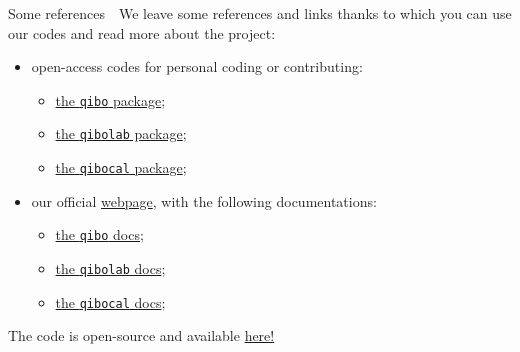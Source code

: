 \documentclass[8pt, xcolor={svgnames}, hyperref={colorlinks, linkcolor=black, citecolor=amethyst, urlcolor=amethyst}]{beamer}
\begin{document}
\begin{frame}{Some references}
\large
\faArrowCircleRight\,\, We leave some references and links thanks to which you can use our codes and read more about the project:

\begin{multicols}{2}
    
\begin{itemize}
\item[\faCode] open-access codes for personal coding or contributing:
    \begin{itemize}[noitemsep]
        \item[\faGithub]  \href{https://github.com/qiboteam/qibo}{the \texttt{qibo} package};
        \item[\faGithub]  \href{https://github.com/qiboteam/qibolab}{the \texttt{qibolab} package};
        \item[\faGithub]  \href{https://github.com/qiboteam/qibocal}{the \texttt{qibocal} package};
    \end{itemize}
 \vspace{1cm}

\item[\faBook] our official \href{https://qibo.science/}{webpage}, with the following documentations:
    \begin{itemize}[noitemsep]
        \item[\faLeanpub]  \href{https://qibo.science/docs/qibo/stable}{the \texttt{qibo} docs};
        \item[\faLeanpub]  \href{https://qibo.science/docs/qibolab/stable}{the \texttt{qibolab} docs};
        \item[\faLeanpub]  \href{https://qibo.science/docs/qibocal/stable}{the \texttt{qibocal} docs};
    \end{itemize}
\end{itemize}
\end{multicols}

The code is open-source and available \href{https://github.com/qiboteam/adiabatic-fit}{here!}
\end{frame}
\end{document}

